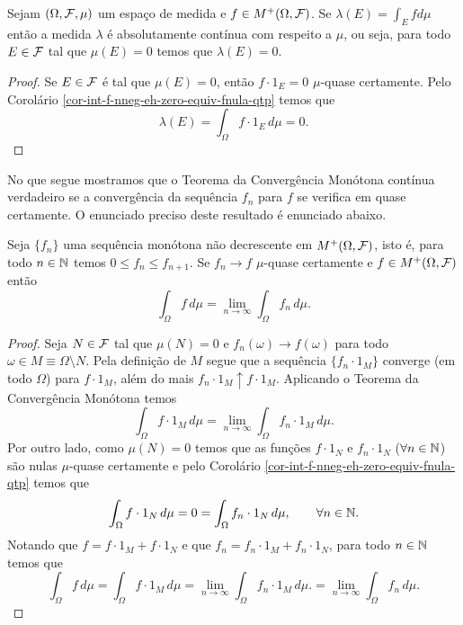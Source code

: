 \begin{corolario}
Sejam $(\Omega,\mathcal{F},\mu)$ um espaço de medida e 
$f\in M^{+}(\Omega,\mathcal{F})$. Se  
$\lambda(E)=\int_{E}f d\mu$ então a medida 
$\lambda$ é absolutamente contínua com respeito 
a $\mu$, ou seja, para todo $E\in\mathcal{F}$ tal que 
$\mu(E)=0$ temos que $\lambda(E)=0$. 
\end{corolario}


\begin{proof}
Se $E\in\mathcal{F}$ é tal que $\mu(E)=0$, 
então $f\cdot 1_{E} =0$ $\mu$-quase certamente.
Pelo Corolário \ref{cor-int-f-nneg-eh-zero-equiv-fnula-qtp}
temos que 
	\[
		\lambda(E)
		=
		\int_{\Omega}f\cdot 1_{E}\, d\mu
		=
		0.
	\]
\end{proof}






No que segue mostramos que o Teorema 
da Convergência Monótona contínua 
verdadeiro se a convergência da sequência 
$f_n$ para $f$ se verifica em quase certamente.
O enunciado preciso deste resultado é enunciado 
abaixo.





\begin{corolario}
\label{Teo-TCM-quase-certamente}
Seja $\{f_n\}$ uma sequência monótona
não decrescente em 
$M^{+}(\Omega,\mathcal{F})$, isto é, 
para todo $n\in\mathbb{N}$ temos $0\leq f_n\leq f_{n+1}$.
Se $f_n \to f$ $\mu$-quase certamente 
e $f\in M^{+}(\Omega,\mathcal{F})$ então
	\[
	\int_{\Omega} f\, d\mu 
	=
	\lim_{n\to\infty}\int_{\Omega} f_n\, d\mu.
	\]
\end{corolario}
 
 
\begin{proof}
Seja $N\in \mathcal{F}$ tal que $\mu(N)=0$ e 
$f_n(\omega)\to f(\omega)$ para todo 
$\omega\in M\equiv \Omega\setminus N$.
Pela definição de $M$ segue que a sequência
$\{f_n\cdot 1_{M}\}$ converge (em todo $\Omega$)
para $f\cdot 1_{M}$, além do mais 
$f_n\cdot 1_{M}\uparrow f\cdot 1_{M}$.
Aplicando o Teorema da Convergência Monótona 
temos 
	\[
		\int_{\Omega} f\cdot 1_{M}\, d\mu 
		=
		\lim_{n\to\infty} \int_{\Omega} f_n\cdot 1_{M}\, d\mu.
	\]
Por outro lado, como $\mu(N)=0$ temos que 
as funções $f\cdot 1_{N}$ e $f_n\cdot 1_{N}$
($\forall n\in\mathbb{N}$) 
são nulas $\mu$-quase certamente e 
pelo Corolário \ref{cor-int-f-nneg-eh-zero-equiv-fnula-qtp}
temos que 
	\[
		\int_{\Omega} f\cdot 1_{N}\, d\mu 
		=
		0
		=
		\int_{\Omega} f_n\cdot 1_{N}\, d\mu,
		\qquad\forall n\in\mathbb{N}.	
	\]
Notando que $f=f\cdot 1_{M}+f\cdot 1_{N}$ e 
que $f_n=f_n\cdot 1_{M}+f_n\cdot 1_{N}$, 
para todo $n\in\mathbb{N}$ temos que 
	\[
	\int_{\Omega}f\, d\mu 
	=
	\int_{\Omega} f\cdot 1_{M}\, d\mu 
	=
	\lim_{n\to\infty} \int_{\Omega} f_n\cdot 1_{M}\, d\mu.	
	=
	\lim_{n\to\infty} \int_{\Omega} f_n\, d\mu.	
	\]
\end{proof}



